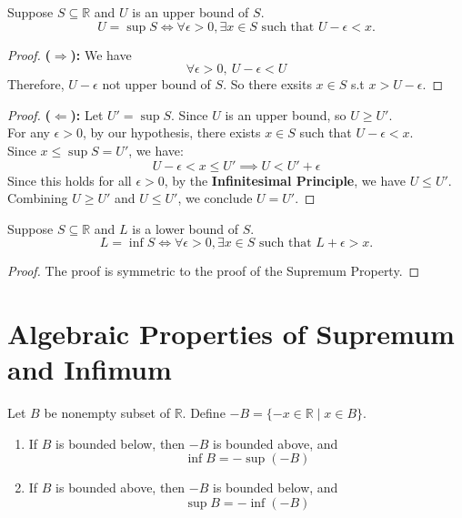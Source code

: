 \documentclass[
	UTF-8,
	11pt, %
	a4paper, %
]{LegrandOrangeBook}
\begin{document}
    \begin{theorem}
    Suppose $S \subseteq \mathbb{R}$ and $U$ is an upper bound of $S$.
    \[ U = \sup S \iff \forall \epsilon > 0, \exists x \in S \text{ such that } U - \epsilon < x. \]
    \end{theorem}

    \begin{proof}
    \textbf{($\Rightarrow$):} We have
    $$ \forall \epsilon > 0,\ U - \epsilon<U $$
    Therefore, $U - \epsilon$ not upper bound of $S$. 
    So there exsits $x \in S$ s.t $ x >U - \epsilon$.
    \end{proof}
    \begin{proof}
    \textbf{($\Leftarrow$):} 
    Let $U' = \sup S$. Since $U$ is an upper bound, so $U \ge U'$. \\
    For any $\epsilon > 0$, by our hypothesis, there exists $x \in S$ such that $U - \epsilon < x$. \\
    Since $x \le \sup S = U'$, we have:
    \[ U - \epsilon < x \le U' \implies U < U' + \epsilon \]
    Since this holds for all $\epsilon > 0$, by the \textbf{Infinitesimal Principle}, we have $U \le U'$. \\
    Combining $U \ge U'$ and $U \le U'$, we conclude $U = U'$.
    \end{proof}

    \begin{theorem}
    Suppose $S \subseteq \mathbb{R}$ and $L$ is a lower bound of $S$.
    \[ L = \inf S \iff \forall \epsilon > 0, \exists x \in S \text{ such that } L + \epsilon > x. \]
    \end{theorem}

    \begin{proof}
    The proof is symmetric to the proof of the Supremum Property.
    \end{proof}

    \newpage

    \section{Algebraic Properties of Supremum and Infimum}

    \begin{proposition}
    Let $B$ be nonempty subset of $\mathbb{R}$.
    Define $-B = \{-x \in \mathbb{R} \mid x \in B\}$.
        \begin{enumerate}
            \item If $B$ is bounded below, then $-B$ is bounded above, and
            \[ \inf B = -\sup(-B)\]
            \item If $B$ is bounded above, then $-B$ is bounded below, and
            \[ \sup B = -\inf(-B)\]
        \end{enumerate}
    
    \end{proposition}
\end{document}
